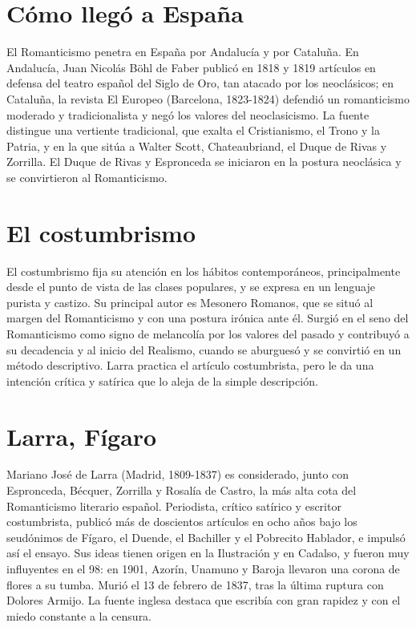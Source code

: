 \documentclass{book}
\begin{document}

\section{Cómo llegó a España}

El Romanticismo penetra en España por Andalucía y por Cataluña. En Andalucía, Juan Nicolás Böhl de Faber publicó en 1818 y 1819 artículos en defensa del teatro español del Siglo de Oro, tan atacado por los neoclásicos; en Cataluña, la revista El Europeo (Barcelona, 1823-1824) defendió un romanticismo moderado y tradicionalista y negó los valores del neoclasicismo. La fuente distingue una vertiente tradicional, que exalta el Cristianismo, el Trono y la Patria, y en la que sitúa a Walter Scott, Chateaubriand, el Duque de Rivas y Zorrilla. El Duque de Rivas y Espronceda se iniciaron en la postura neoclásica y se convirtieron al Romanticismo.


\section{El costumbrismo}

El costumbrismo fija su atención en los hábitos contemporáneos, principalmente desde el punto de vista de las clases populares, y se expresa en un lenguaje purista y castizo. Su principal autor es Mesonero Romanos, que se situó al margen del Romanticismo y con una postura irónica ante él. Surgió en el seno del Romanticismo como signo de melancolía por los valores del pasado y contribuyó a su decadencia y al inicio del Realismo, cuando se aburguesó y se convirtió en un método descriptivo. Larra practica el artículo costumbrista, pero le da una intención crítica y satírica que lo aleja de la simple descripción.


\section{Larra, Fígaro}

Mariano José de Larra (Madrid, 1809-1837) es considerado, junto con Espronceda, Bécquer, Zorrilla y Rosalía de Castro, la más alta cota del Romanticismo literario español. Periodista, crítico satírico y escritor costumbrista, publicó más de doscientos artículos en ocho años bajo los seudónimos de Fígaro, el Duende, el Bachiller y el Pobrecito Hablador, e impulsó así el ensayo. Sus ideas tienen origen en la Ilustración y en Cadalso, y fueron muy influyentes en el 98: en 1901, Azorín, Unamuno y Baroja llevaron una corona de flores a su tumba. Murió el 13 de febrero de 1837, tras la última ruptura con Dolores Armijo. La fuente inglesa destaca que escribía con gran rapidez y con el miedo constante a la censura.
\end{document}
